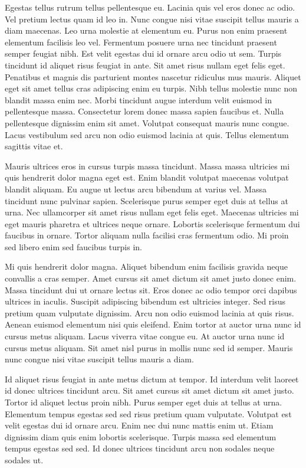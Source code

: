 \documentclass[12pt]{article}
\begin{document}
Egestas tellus rutrum tellus pellentesque eu. Lacinia quis vel eros donec ac odio. Vel pretium lectus quam id leo in. Nunc congue nisi vitae suscipit tellus mauris a diam maecenas. Leo urna molestie at elementum eu. Purus non enim praesent elementum facilisis leo vel. Fermentum posuere urna nec tincidunt praesent semper feugiat nibh. Est velit egestas dui id ornare arcu odio ut sem. Turpis tincidunt id aliquet risus feugiat in ante. Sit amet risus nullam eget felis eget. Penatibus et magnis dis parturient montes nascetur ridiculus mus mauris. Aliquet eget sit amet tellus cras adipiscing enim eu turpis. Nibh tellus molestie nunc non blandit massa enim nec. Morbi tincidunt augue interdum velit euismod in pellentesque massa. Consectetur lorem donec massa sapien faucibus et. Nulla pellentesque dignissim enim sit amet. Volutpat consequat mauris nunc congue. Lacus vestibulum sed arcu non odio euismod lacinia at quis. Tellus elementum sagittis vitae et.

Mauris ultrices eros in cursus turpis massa tincidunt. Massa massa ultricies mi quis hendrerit dolor magna eget est. Enim blandit volutpat maecenas volutpat blandit aliquam. Eu augue ut lectus arcu bibendum at varius vel. Massa tincidunt nunc pulvinar sapien. Scelerisque purus semper eget duis at tellus at urna. Nec ullamcorper sit amet risus nullam eget felis eget. Maecenas ultricies mi eget mauris pharetra et ultrices neque ornare. Lobortis scelerisque fermentum dui faucibus in ornare. Tortor aliquam nulla facilisi cras fermentum odio. Mi proin sed libero enim sed faucibus turpis in.

Mi quis hendrerit dolor magna. Aliquet bibendum enim facilisis gravida neque convallis a cras semper. Amet cursus sit amet dictum sit amet justo donec enim. Massa tincidunt dui ut ornare lectus sit. Eros donec ac odio tempor orci dapibus ultrices in iaculis. Suscipit adipiscing bibendum est ultricies integer. Sed risus pretium quam vulputate dignissim. Arcu non odio euismod lacinia at quis risus. Aenean euismod elementum nisi quis eleifend. Enim tortor at auctor urna nunc id cursus metus aliquam. Lacus viverra vitae congue eu. At auctor urna nunc id cursus metus aliquam. Sit amet nisl purus in mollis nunc sed id semper. Mauris nunc congue nisi vitae suscipit tellus mauris a diam.

Id aliquet risus feugiat in ante metus dictum at tempor. Id interdum velit laoreet id donec ultrices tincidunt arcu. Sit amet cursus sit amet dictum sit amet justo. Tortor id aliquet lectus proin nibh. Purus semper eget duis at tellus at urna. Elementum tempus egestas sed sed risus pretium quam vulputate. Volutpat est velit egestas dui id ornare arcu. Enim nec dui nunc mattis enim ut. Etiam dignissim diam quis enim lobortis scelerisque. Turpis massa sed elementum tempus egestas sed sed. Id donec ultrices tincidunt arcu non sodales neque sodales ut.
\end{document}
